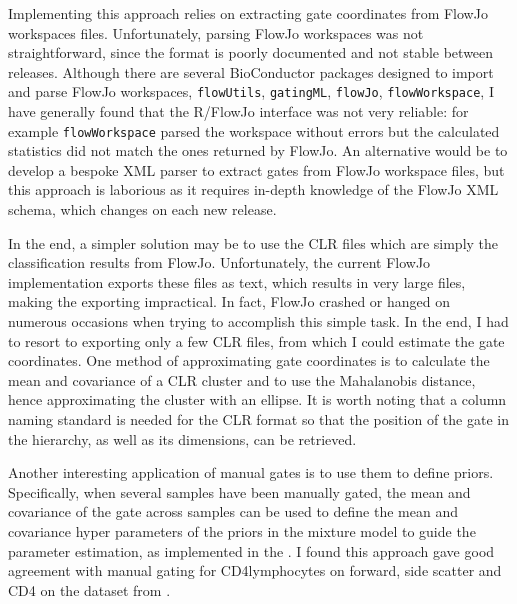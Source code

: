 Implementing this approach relies on extracting gate coordinates from FlowJo workspaces files.
Unfortunately, parsing FlowJo workspaces was not straightforward, since the format is poorly documented and not stable between releases.
Although there are several BioConductor packages designed to import and parse FlowJo workspaces, \texttt{flowUtils}, \texttt{gatingML}, \texttt{flowJo}, \texttt{flowWorkspace}, I have generally found that the R/FlowJo interface was not very reliable: for example \texttt{flowWorkspace} parsed the workspace without errors but the calculated statistics did not match the ones returned by FlowJo.
An alternative would be to develop a bespoke XML parser to extract gates from FlowJo workspace files, but this approach is laborious as it requires in-depth knowledge of the FlowJo XML schema, which changes on each new release.

In the end, a simpler solution may be to use the CLR files which are simply the classification results from FlowJo.
Unfortunately, the current FlowJo implementation exports these files as text, which results in very large files, making the exporting impractical. 
In fact, FlowJo crashed or hanged on numerous occasions when trying to accomplish this simple task.
In the end, I had to resort to exporting only a few CLR files, from which I could estimate the gate coordinates.
One method of approximating gate coordinates is to calculate the mean and covariance of a CLR cluster and to use the Mahalanobis distance, hence approximating the cluster with an ellipse.
It is worth noting that a column naming standard is needed for the CLR format so that the position of the gate in the hierarchy, as well as its dimensions, can be retrieved.

Another interesting application of manual gates is to use them to define priors.
Specifically, when several samples have been manually gated, the mean and covariance of the gate across samples can be used to define the mean and covariance hyper parameters of the priors in the mixture model to guide the parameter estimation, as implemented in the .
I found this approach gave good agreement with manual gating for CD4\positive lymphocytes on forward, side scatter and CD4 on the dataset from .

